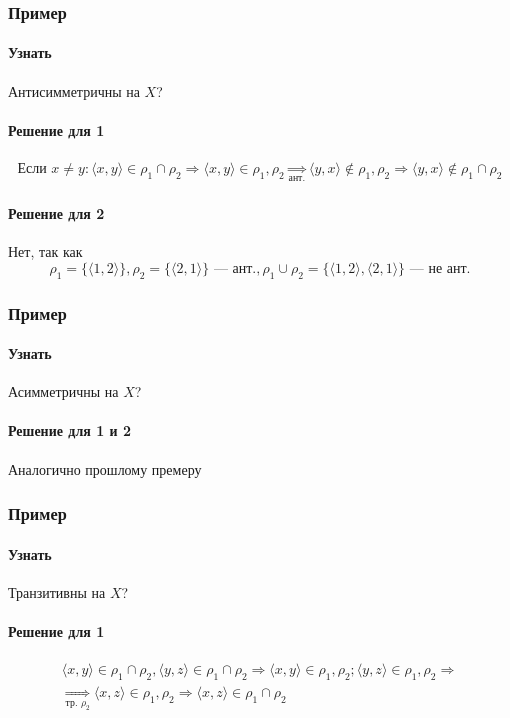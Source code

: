 \documentclass{article}
\begin{document}
\subsubsection{Пример}
\paragraph{Узнать}
Антисимметричны на $X$?

\paragraph{Решение для 1}
\begin{gather*}
    \text{Если } x \neq y: \langle x, y \rangle \in \rho_1 \cap \rho_2 \Rightarrow 
    \langle x, y \rangle \in \rho_1, \rho_2 \underset{\text{ант.}}{\Rightarrow} 
    \langle y, x \rangle \notin \rho_1, \rho_2 \Rightarrow \langle y, x \rangle \notin \rho_1 \cap \rho_2
\end{gather*}

\paragraph{Решение для 2}
Нет, так как
\[
    \rho_1 = \{\langle 1, 2 \rangle\}, \rho_2 = \{\langle 2, 1 \rangle\} \text{ --- ант.}, \rho_1 \cup \rho_2 = \{\langle 1, 2 \rangle, \langle 2, 1 \rangle\} \text{ --- не ант.}
\]


\subsubsection{Пример}
\paragraph{Узнать}
Асимметричны на $X$?

\paragraph{Решение для 1 и 2}
Аналогично прошлому премеру


\subsubsection{Пример}
\paragraph{Узнать}
Транзитивны на $X$?

\paragraph{Решение для 1}
\begin{gather*}
    \langle x, y \rangle \in \rho_1 \cap \rho_2, \langle y, z \rangle \in \rho_1 \cap \rho_2 \Rightarrow \langle x, y \rangle \in \rho_1, \rho_2; \langle y, z \rangle \in \rho_1, \rho_2 \Rightarrow \\
    \underset{\text{тр. }\rho_2}{\Rightarrow} \langle x, z \rangle \in \rho_1, \rho_2 \Rightarrow \langle x, z \rangle \in \rho_1 \cap \rho_2
\end{gather*}
\end{document}
